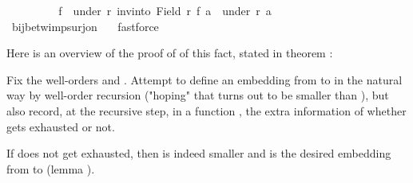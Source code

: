 \begin{isabellebody}
\ \ \ \ \ \ \isamarkupfalse%
\ \isamarkupfalse%
\ {\isachardoublequoteopen}f\ {\isacharbackquote}{\kern0pt}\ under\ r\ {\isacharparenleft}{\kern0pt}inv{\isacharunderscore}{\kern0pt}into\ {\isacharparenleft}{\kern0pt}Field\ r{\isacharparenright}{\kern0pt}\ f\ a{\isacharparenright}{\kern0pt}\ {\isacharequal}{\kern0pt}\ under\ r{\isacharprime}{\kern0pt}\ a{\isachardoublequoteclose}\isanewline
\ \ \ \ \ \ \ \ \isamarkupfalse%
\ bij{\isacharunderscore}{\kern0pt}betw{\isacharunderscore}{\kern0pt}imp{\isacharunderscore}{\kern0pt}surj{\isacharunderscore}{\kern0pt}on\ {\isacharasterisk}{\kern0pt}\ \isamarkupfalse%
\ fastforce\isanewline
\ \ \ \ \isamarkupfalse%
\isanewline
\ \ \isamarkupfalse%
\isanewline
{}\isamarkupfalse%
%
\endisatagproof
{\isafoldproof}%
%
\isadelimproof
%
\endisadelimproof
%
\isadelimdocument
%
\endisadelimdocument
%
\isatagdocument
%
\isamarkuptrue%
%
\endisatagdocument
{\isafolddocument}%
%
\isadelimdocument
%
\endisadelimdocument
%
\begin{isamarkuptext}%
Here is an overview of the proof of of this fact, stated in theorem
:

   Fix the well-orders  and .
   Attempt to define an embedding  from  to  in the
   natural way by well-order recursion ("hoping" that  turns out to be smaller
   than ), but also record, at the recursive step, in a function
   , the extra information of whether 
   gets exhausted or not.

   If  does not get exhausted, then  is indeed smaller
   and  is the desired embedding from  to 
   (lemma ).


\end{isamarkuptext}
\end{isabellebody}
